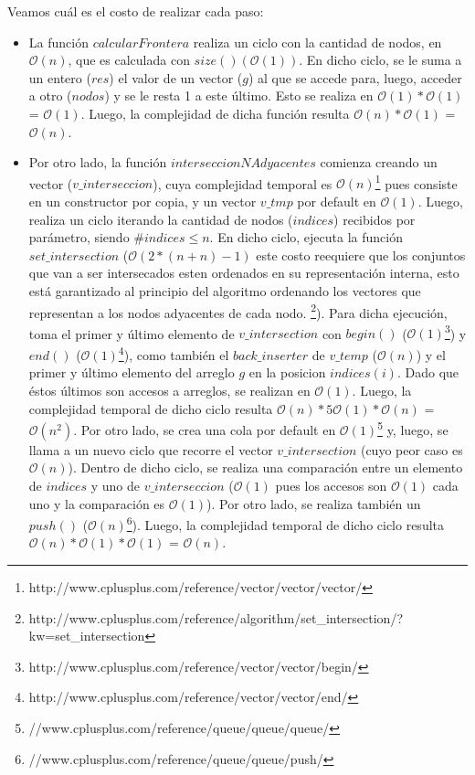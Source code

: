 Veamos cuál es el costo de realizar cada paso:
\begin{itemize}
\item La función $calcularFrontera$ realiza un ciclo con la cantidad de nodos, en $\mathcal{O}(n)$, que es calculada con $size() (\mathcal{O}(1))$. En dicho ciclo, se le suma a un entero ($res$) el valor de un vector ($g$) al que se accede para, luego, acceder a otro ($nodos$) y se le resta 1 a este último. Esto se realiza en $\mathcal{O}(1)*\mathcal{O}(1)$ = $\mathcal{O}(1)$. Luego, la complejidad de dicha función resulta $\mathcal{O}(n)*\mathcal{O}(1)$ = $\mathcal{O}(n)$.
\item Por otro lado, la función $interseccionNAdyacentes$ comienza creando un vector ($v\_interseccion$), cuya complejidad temporal es $\mathcal{O}(n)$\footnote{http://www.cplusplus.com/reference/vector/vector/vector/} pues consiste en un constructor por copia, y un vector $v\_tmp$ por default en $\mathcal{O}(1)$. Luego, realiza un ciclo iterando la cantidad de nodos ($indices$) recibidos por parámetro, siendo $\#indices \leq n$. En dicho ciclo, ejecuta la función $set\_intersection$ ($\mathcal{O}(2*(n+n)-1)$ este costo reequiere que los conjuntos que van a ser intersecados esten ordenados en su representación interna, esto está garantizado al principio del algoritmo ordenando los vectores que representan a los nodos adyacentes de cada nodo. \footnote{http://www.cplusplus.com/reference/algorithm/set\_intersection/?kw=set\_intersection}). Para dicha ejecución, toma el primer y último elemento de $v\_intersection$ con $begin()$ ($\mathcal{O}(1)$\footnote{http://www.cplusplus.com/reference/vector/vector/begin/}) y $end()$ ($\mathcal{O}(1)$\footnote{http://www.cplusplus.com/reference/vector/vector/end/}), como también el $back\_inserter$ de $v\_temp$ ($\mathcal{O}(n)$) y el primer y último elemento del arreglo $g$ en la posicion $indices(i)$. Dado que éstos últimos son accesos a arreglos, se realizan en $\mathcal{O}(1)$. Luego, la complejidad temporal de dicho ciclo resulta $\mathcal{O}(n)*5\mathcal{O}(1)*\mathcal{O}(n)$ = $\mathcal{O}(n^2)$.\newline
\newline
Por otro lado, se crea una cola por default en $\mathcal{O}(1)$\footnote{//www.cplusplus.com/reference/queue/queue/queue/} y, luego, se llama a un nuevo ciclo que recorre el vector $v\_intersection$ (cuyo peor caso es $\mathcal{O}(n)$). Dentro de dicho ciclo, se realiza una comparación entre un elemento de $indices$ y uno de $v\_interseccion$ ($\mathcal{O}(1)$ pues los accesos son $\mathcal{O}(1)$ cada uno y la comparación es $\mathcal{O}(1)$). Por otro lado, se realiza también un $push()$ ($\mathcal{O}(n)$\footnote{//www.cplusplus.com/reference/queue/queue/push/}). Luego, la complejidad temporal de dicho ciclo resulta $\mathcal{O}(n)*\mathcal{O}(1)*\mathcal{O}(1)$ = $\mathcal{O}(n)$.\newline

\end{itemize}
